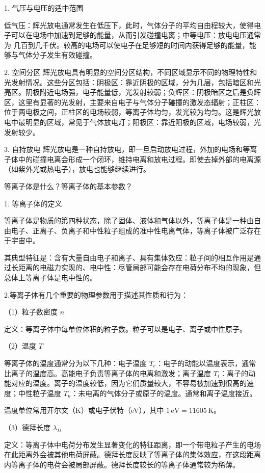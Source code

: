 \documentclass[dvipsnames, svgnames,a4paper,11pt]{article}
\begin{document}
1. 气压与电压的适中范围

低气压：辉光放电通常发生在低压下，此时，气体分子的平均自由程较大，使得电子可以在电场中加速到足够的能量，从而引发碰撞电离；中等电压：放电电压通常为 几百到几千伏。较高的电场可以使电子在足够短的时间内获得足够的能量，能够与气体分子发生有效碰撞。

2. 空间分区
辉光放电具有明显的空间分区结构，不同区域显示不同的物理特性和光发射情况。这些分区包括：阴极区：靠近阴极的区域，分为几层，包括暗区和光亮区。阴极附近电场强，电子能量低，光发射较弱；负辉区：阴极暗区之后是负辉区，这里有显著的光发射，主要来自电子与气体分子碰撞的激发态辐射；正柱区：位于两电极之间，正柱区的电场较弱，等离子体均匀，发光较为均匀。这是辉光放电中最明显的区域，常见于气体放电灯；阳极区：靠近阳极的区域，电场较弱，光发射较少。

3. 自持放电
辉光放电是一种自持放电，即一旦启动放电过程，外加的电场和等离子体中的碰撞电离会形成一个闭环，维持电离和放电过程。即使去掉外部的电离源（如紫外光或热电子），放电也能够继续进行。


\begin{question}
	等离子体是什么？等离子体的基本参数？
\end{question}
1. 等离子体的定义

等离子体是物质的第四种状态，除了固体、液体和气体以外，等离子体是一种由自由电子、正离子、负离子和中性粒子组成的准中性电离气体，等离子体被广泛存在于宇宙中。

其典型特征是：含有大量自由电子和离子、具有集体效应：粒子间的相互作用是通过长距离的电磁力实现的、电中性：尽管局部可能会存在电荷分布不均的现象，但总体上等离子体是电中性的。

2.等离子体有几个重要的物理参数用于描述其性质和行为：

（1）粒子数密度 \( n \)

定义：等离子体中每单位体积的粒子数。粒子可以是电子、离子或中性原子。

（2）温度 \( T \)

等离子体的温度通常分为以下几种：电子温度 \( T_e \)：电子的动能以温度表示，通常比离子的温度高。高能电子负责等离子体的电离和激发；离子温度 \( T_i \)：离子的动能对应的温度。离子的温度较低，因为它们质量较大，不容易被加速到很高的速度；中性粒子温度 \( T_n \)：未电离的气体分子或原子的温度。通常和离子温度接近。

温度单位常用开尔文（K）或电子伏特（eV），其中 \( 1 \, \text{eV} = 11605 \, \text{K} \)。

（3）德拜长度 \( \lambda_D \)

定义：等离子体中电荷分布发生显著变化的特征距离，即一个带电粒子产生的电场在此距离外会被其他电荷屏蔽。德拜长度反映了等离子体的集体效应，在这段距离内等离子体的电荷会被局部屏蔽。德拜长度较长的等离子体通常较为稀薄。
\end{document}
